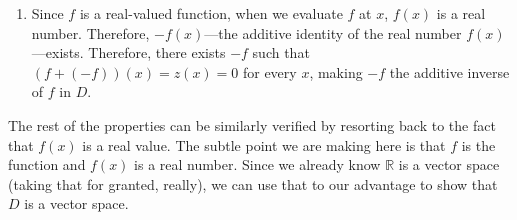 {\begin{enumerate}
	 Since this is true for any $x$, we conclude that $f+z = f$.  
	 
	 \item Since $f$ is a real-valued function, when we evaluate $f$ at $x$, $f(x)$ is a real number.  Therefore, $-f(x)$---the additive identity of the real number $f(x)$---exists.  Therefore, there exists $-f$ such that $(f+(-f))(x) = z(x) = 0$ for every $x$, making $-f$ the additive inverse of $f$ in $D$.  
\end{enumerate}
The rest of the properties can be similarly verified by resorting back to the fact that $f(x)$ is a real value.  The subtle point we are making here is that $f$ is the function and $f(x)$ is a real number.  Since we already know $\mathbb{R}$ is a vector space (taking that for granted, really), we can use that to our advantage to show that $D$ is a vector space.
}

